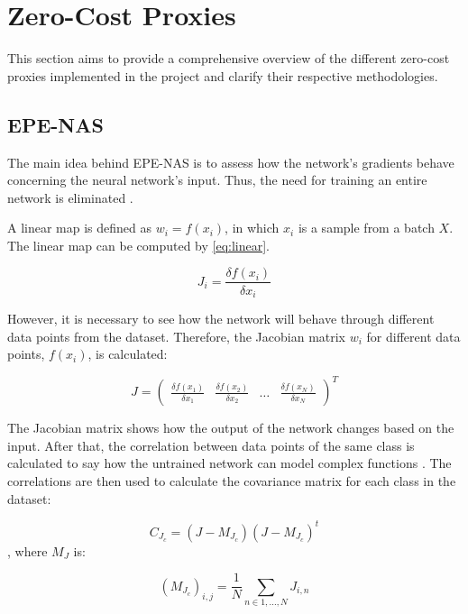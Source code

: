 \section{Zero-Cost Proxies}\label{zcproxies}

This section aims to provide a comprehensive overview of the different zero-cost proxies implemented in the project and clarify their respective methodologies.


\subsection{EPE-NAS}
The main idea behind EPE-NAS is to assess how the network's gradients behave concerning the neural network's input. Thus, the need for training an entire network is eliminated \autocite{lopes2021epe}. 

A linear map is defined as $w_i = f(x_i)$, in which $x_i$ is a sample from a batch $X$. The linear map can be computed by \cref{eq:linear}. 

\begin{equation}
    J_i = \frac{\delta f(x_i)}{\delta x_i}
    \label{eq:linear}
\end{equation}

However, it is necessary to see how the network will behave through different data points from the dataset. Therefore, the Jacobian matrix $w_i$ for different data points, $f(x_i)$, is calculated:

\begin{equation}
J = \begin{pmatrix}
\frac{\delta f(x_1)}{\delta x_1} & \frac{\delta f(x_2)}{\delta x_2} & \dots & \frac{\delta f(x_N)}{\delta x_N} 
 \end{pmatrix}^T
\end{equation}

The Jacobian matrix shows how the output of the network changes based on the input. After that, the correlation between data points of the same class is calculated to say how the untrained network can model complex functions \autocite{lopes2021epe}. The correlations are then used to calculate the covariance matrix for each class in the dataset:

\begin{equation}
    C_{J_c} = (J - M_{J_c})(J-M_{J_c})^t
\end{equation}
, where $M_J$ is:

\begin{equation}
    (M_{J_c})_{i,j} = \frac{1}{N} \sum_{n \in {1,...,N}} J_{i,n}
\end{equation}


